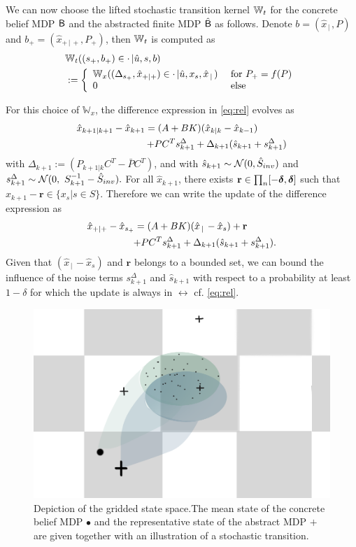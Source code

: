 \documentclass{ifacconf}
\begin{document}
We can now choose the lifted stochastic transition kernel 	$\Wt$ for the concrete belief MDP $\MB$ and the abstracted finite MDP $\hat\MB$ as follows.
Denote $b=(\hat x_{\,|\,}, P)$ and $b_+=(\hat x_{+\,|\,+}, P_+)$, then 	$\Wt$ is computed as 
 \begin{align*}
 &	\Wt((s_+,b_+)\in \cdot\,| \hat u, s ,b)\\&:= \left\{\begin{array}{ll} \mathbb W_{x}((\Delta_{s_+}, \hat x_{+|+})\in \cdot\,|  \hat u,x_s , \hat x_{\,|\,}) &\text{ for }  P_+=f(P)\\
 	0 & \text{ else } \end{array}\right.
 \end{align*}

For this choice of  	$\mathbb W_x$, the difference expression in \eqref{eq:rel} evolves   as 
\begin{align}
 \hat x_{k+1|k+1}-	\hat x_{k+1}=(A+BK)(\hat x_{k|k}-\hat x_{k-1})\qquad \quad\notag\\+  \bar P   C^T s^\Delta_{k+1} +\Delta_{k+1}( \hat{s}_{k+1}+ s^\Delta_{k+1})\label{eq:beliefx2}
\end{align}
 with $\Delta_{k+1}:=(P_{k+1|k}C^T-  \bar P   C^T)$, and with $ \hat{s}_{k+1}\sim \CA N (0,\hat{S}_{inv})$ and $ s^\Delta_{k+1}\sim  \CA N (0,\  S_{k+1}^{-1}-\hat{S}_{inv}). $
For all $ \hat x_{k+1}$, there exists $\mathbf  r \in \prod_n[-\grid ,\grid]$ such that   $\hat x_{k+1}-\mathbf r \in \{x_s| s \in S\}$. Therefore we can write the update of the difference expression as  \begin{align}
 \hat x_{+|+}-	\hat x_{s_+}=(A+BK)(\hat x_{\,|\,}-\hat x_s)+\mathbf r\qquad \quad\notag\\+  \bar P   C^T s^\Delta_{k+1} +\Delta_{k+1}( \hat{s}_{k+1}+ s^\Delta_{k+1})\label{eq:beliefx2}.
\end{align}
Given that $(\hat x_{\,|\,}-\hat x_s)$ and  $\mathbf r$ belongs to a bounded set, we can bound the influence of the noise terms $s^\Delta_{k+1}$ and $ \hat{s}_{k+1}$ with respect to a probability at least $1-\delta$ for which the update is always in $\rel$ cf.  \eqref{eq:rel}.

\begin{figure}[htp]
\centering
	\includegraphics[width = .8\columnwidth]{figs/grid}
	\caption{Depiction of the gridded state space.The mean state of the concrete belief MDP $\bullet$ and the  representative state of the abstract MDP $\boldsymbol{+}$ are given together with an illustration of a stochastic transition. }
\end{figure}
\end{document}
